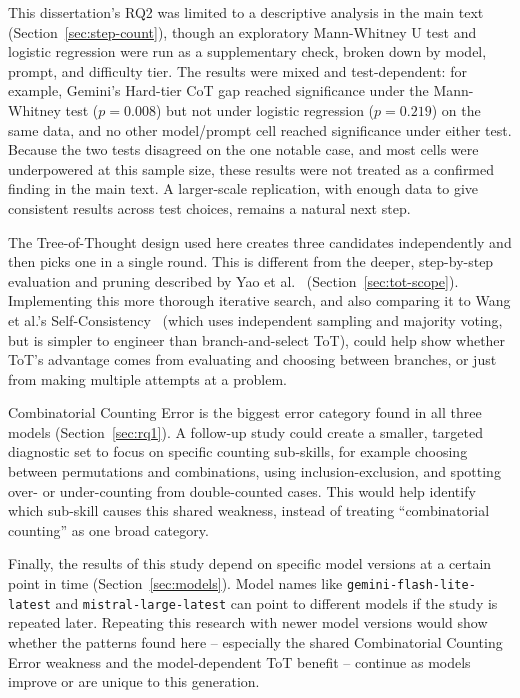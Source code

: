 This dissertation's RQ2 was limited to a descriptive analysis in the
main text (Section~\ref{sec:step-count}), though an exploratory
Mann-Whitney U test and logistic regression were run as a supplementary
check, broken down by model, prompt, and difficulty tier. The results
were mixed and test-dependent: for example, Gemini's Hard-tier CoT gap
reached significance under the Mann-Whitney test ($p = 0.008$) but not
under logistic regression ($p = 0.219$) on the same data, and no other
model/prompt cell reached significance under either test. Because the
two tests disagreed on the one notable case, and most cells were
underpowered at this sample size, these results were not treated as a
confirmed finding in the main text. A larger-scale replication, with
enough data to give consistent results across test choices, remains a
natural next step.

The Tree-of-Thought design used here creates three candidates
independently and then picks one in a single round. This is different
from the deeper, step-by-step evaluation and pruning described by Yao et
al.~\cite{yao2023tree} (Section~\ref{sec:tot-scope}). Implementing this
more thorough iterative search, and also comparing it to Wang et al.'s
Self-Consistency~\cite{wang2023selfconsistency} (which uses independent
sampling and majority voting, but is simpler to engineer than
branch-and-select ToT), could help show whether ToT's advantage comes
from evaluating and choosing between branches, or just from making
multiple attempts at a problem.

Combinatorial Counting Error is the biggest error category found in all
three models (Section~\ref{sec:rq1}). A follow-up study could create a
smaller, targeted diagnostic set to focus on specific counting
sub-skills, for example choosing between permutations and combinations,
using inclusion-exclusion, and spotting over- or under-counting from
double-counted cases. This would help identify which sub-skill causes
this shared weakness, instead of treating ``combinatorial counting'' as
one broad category.

Finally, the results of this study depend on specific model versions at
a certain point in time (Section~\ref{sec:models}). Model names like
\texttt{gemini-flash-lite-latest} and \texttt{mistral-large-latest} can
point to different models if the study is repeated later. Repeating this
research with newer model versions would show whether the patterns found
here -- especially the shared Combinatorial Counting Error weakness and
the model-dependent ToT benefit -- continue as models improve or are
unique to this generation.

